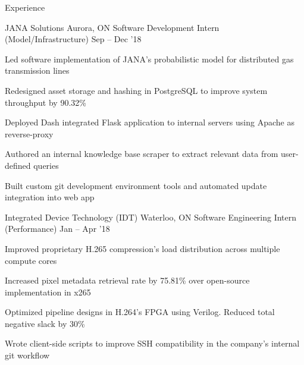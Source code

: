 \documentclass{resume} %
\begin{document}
\begin{rSection}{Experience}
  \begin{rWorkSection}{JANA Solutions}
                     {Aurora, ON}
                     {Software Development Intern (Model/Infrastructure)}
                     {Sep -- Dec '18}
    \item Led software implementation of JANA's probabilistic model for distributed gas transmission lines
    \item Redesigned asset storage and hashing in PostgreSQL to improve system throughput by 90.32\%    
    \item Deployed Dash integrated Flask application to internal servers using Apache as reverse-proxy
    \item Authored an internal knowledge base scraper to extract relevant data from user-defined queries
    \item Built custom git development environment tools and automated update integration into web app
  \end{rWorkSection}
  \begin{rWorkSection}{Integrated Device Technology (IDT)}
                     {Waterloo, ON}
                     {Software Engineering Intern (Performance)}
                     {Jan -- Apr '18}
    \item Improved proprietary H.265 compression's load distribution across multiple compute cores
    \item Increased pixel metadata retrieval rate by 75.81\% over open-source implementation in x265
    \item Optimized pipeline designs in H.264's FPGA using Verilog. Reduced total
	  negative slack by 30\%
    \item Wrote client-side scripts to improve SSH compatibility in the
	  company's internal git workflow
  \end{rWorkSection}
\end{rSection}

\end{document}
